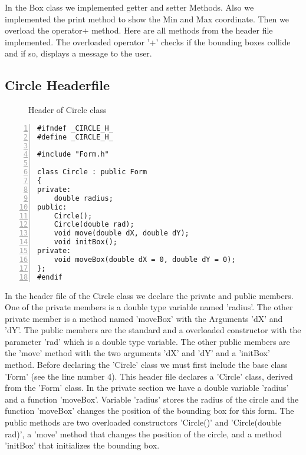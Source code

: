 \documentclass{article}
\begin{document}
\normalsize{In the Box class we implemented getter and setter Methods. Also we implemented the print method to show the Min and Max coordinate. Then we overload the  operator$+$ method.\newline
\newline
Here are all methods from the header file implemented.
The overloaded operator '+' checks if the bounding boxes collide and if so, displays a message to the user.
}\newpage
\subsection{Circle Headerfile}
\begin{figure}
\scriptsize{\caption{Header of Circle class}}
\end{figure}
\begin{lstlisting}[basicstyle=\footnotesize\ttfamily, numbers=left, stepnumber=1, numberstyle = \normalsize, caption={My Caption}]
#ifndef _CIRCLE_H_
#define _CIRCLE_H_

#include "Form.h"

class Circle : public Form
{
private:
	double radius;
public:
	Circle();
	Circle(double rad);
	void move(double dX, double dY);
	void initBox();
private:
	void moveBox(double dX = 0, double dY = 0);
};
#endif
\end{lstlisting}
\normalsize{In the header file of the Circle class we declare the private and public members. One of the private members is a double type variable named 'radius'. The other private member is a method named 'moveBox' with the Arguments 'dX' and 'dY'. The public members are the standard and a overloaded constructor with the parameter 'rad' which is a double type variable. The other public members are the 'move' method with the two arguments 'dX' and 'dY' and a 'initBox' method.\newline
\newline
Before declaring the 'Circle' class we must first include the base class 'Form' (see the line number 4).
This header file declares a 'Circle' class, derived from the 'Form' class.
In the private section we have a double variable 'radius' and a function 'moveBox'. Variable 'radius' stores the radius of the circle and the function 'moveBox' changes the position of the bounding box for this form.
The public methods are two overloaded constructors 'Circle()' and 'Circle(double rad)', a 'move' method that changes the position of the circle, and a method 'initBox' that initializes the bounding box.

}
\newpage
\end{document}
